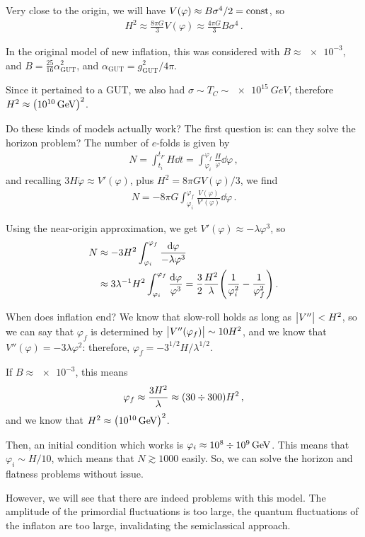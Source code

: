 \documentclass[main.tex]{subfiles}
\begin{document}
Very close to the origin, we will have \(V(\varphi ) \approx B \sigma^{4} / 2 = \text{const}\), so 
%
\begin{align}
H^2 \approx \frac{8 \pi G}{3} V(\varphi ) \approx \frac{4 \pi G}{3} B \sigma^{4}
\,.
\end{align}

In the original model of new inflation, this was considered with \(B \approx \num{e-3}\), and \(B = \frac{25}{16} \alpha^2 _{\text{GUT}}\), and \(\alpha _{\text{GUT}} = g _{\text{GUT}}^2 / 4 \pi \). 

Since it pertained to a GUT, we also had \(\sigma \sim T_C \sim \SI{e15}{GeV}\), therefore \(H^2 \approx \qty(\SI{e10}{GeV})^2\). 

Do these kinds of models actually work? The first question is: can they solve the horizon problem? The number of \(e\)-folds is given by 
%
\begin{align}
N = \int _{t_i}^{t_F} H \dd{t} = \int_{\varphi _i}^{\varphi _f} \frac{H}{\dot{\varphi}} \dd{\varphi }
\,,
\end{align}
%
and recalling \(3 H \dot{\varphi} \approx V' (\varphi )\), plus \(H^2= 8 \pi G V(\varphi ) /3\), we find 
%
\begin{align}
N = - 8 \pi G \int_{\varphi _i}^{\varphi _f} \frac{V(\varphi )}{V'(\varphi )} \dd{\varphi }
\,.
\end{align}

Using the near-origin approximation, we get \(V'(\varphi ) \approx - \lambda \varphi^3\), so 
%
\begin{align}
N &\approx  - 3 H^2 \int_{\varphi _i}^{\varphi _f} \frac{ \dd{\varphi }}{- \lambda \varphi^3}   \\
&\approx 3 \lambda^{-1} H^2 \int_{\varphi _i}^{\varphi _f} \frac{ \dd{\varphi }}{\varphi^3} = \frac{3}{2} \frac{H^2}{\lambda } \qty( \frac{1}{\varphi _i^2} - \frac{1}{\varphi_f^2})
\,.
\end{align}

When does inflation end?
We know that slow-roll holds as long as \(\abs{V''} < H^2\), so we can say that \(\varphi _f\) is determined by \(\abs{V''(\varphi _f)} \sim 10 H^2\), and we know that \(V''(\varphi ) = - 3 \lambda \varphi^2\): 
therefore, \(\varphi _f = - 3^{1/2} H / \lambda^{1/2}\). 

If \(B \approx \num{e-3}\), this means 
%
\begin{align}
\varphi _f \approx \frac{3 H^2}{\lambda } \approx \qty(30 \divisionsymbol 300) H^2
\,,
\end{align}
%
and we know that \(H^2 \approx \qty(\SI{e10}{GeV})^2\).

Then, an initial condition which works is \(\varphi _i \approx \num{e8} \divisionsymbol \SI{e9}{GeV}\). 
This means that \(\varphi _i \sim H / 10\), which means that \(N \gtrsim 1000\) easily.
So, we can solve the horizon and flatness problems without issue. 

However, we will see that there are indeed problems with this model. 
The amplitude of the primordial fluctuations is too large, the quantum fluctuations of the inflaton are too large, invalidating the semiclassical approach. 
\end{document}

